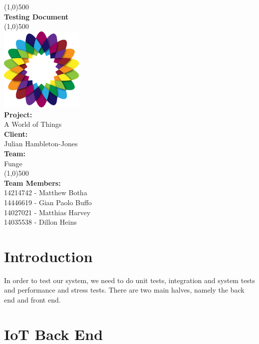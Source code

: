 \documentclass{article}
\begin{document}
\begin{titlepage}
	\begin{center}
		\line(1,0){500}\\
		[6mm]
		\huge{\bfseries Testing Document}\\
		\line(1,0){500}\\
		[5mm]
		\includegraphics[width=150px]{../images/AWorldOfPlants.png}
		\\
		[5mm]
		\large\textbf{Project:}\\A World of Things\\
		[3mm]
		\large\textbf{Client:}\\Julian Hambleton-Jones\\
		[3mm]
		\large \textbf{Team:}\\Funge\\
		\line(1,0){500}\\
		[5mm]
		\large \textbf{Team Members:}\\
		[3mm]
		\large 14214742 - Matthew Botha\\
		\large 14446619 - Gian Paolo Buffo\\
		\large 14027021 - Matthias Harvey\\
        \large 14035538 - Dillon Heins\\[3mm]
	\end{center}
\end{titlepage}

\cleardoublepage
\thispagestyle{empty}
\tableofcontents
\cleardoublepage
\setcounter{page}{1}

\section{Introduction}
	In order to test our system, we need to do unit tests, integration and system tests and performance and stress tests. There are two main halves, namely the back end and front end.

\section{IoT Back End}
\end{document}

